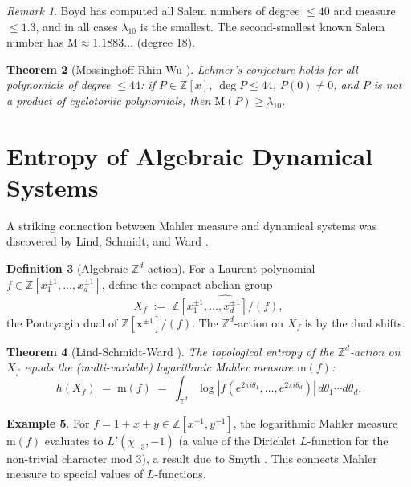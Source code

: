 \documentclass[12pt,a4paper]{amsart}
\newtheorem{theorem}{Theorem}[section]
\theoremstyle{definition}
\newtheorem{definition}[theorem]{Definition}
\newtheorem{example}[theorem]{Example}
\theoremstyle{remark}
\newtheorem{remark}[theorem]{Remark}
\newcommand{\Z}{\mathbb{Z}}
\newcommand{\T}{\mathbb{T}}
\newcommand{\M}{\mathrm{M}}
\newcommand{\m}{\mathrm{m}}
\DeclareMathOperator{\deg}{deg}
\begin{document}
\begin{remark}
  Boyd \cite{Boyd1977,Boyd1981} has computed all Salem numbers of degree $\leq 40$ and
  measure $\leq 1.3$, and in all cases $\lambda_{10}$ is the smallest. The second-smallest
  known Salem number has $\M \approx 1.1883\ldots$ (degree 18).
\end{remark}

\begin{theorem}[Mossinghoff-Rhin-Wu \cite{MRW2008}]
  Lehmer's conjecture holds for all polynomials of degree $\leq 44$: if
  $P \in \Z[x]$, $\deg P \leq 44$, $P(0) \neq 0$, and $P$ is not a product of
  cyclotomic polynomials, then $\M(P) \geq \lambda_{10}$.
\end{theorem}

\section{Entropy of Algebraic Dynamical Systems}\label{sec:entropy}

A striking connection between Mahler measure and dynamical systems was discovered by
Lind, Schmidt, and Ward \cite{LSW1990}.

\begin{definition}[Algebraic $\Z^d$-action]
  For a Laurent polynomial $f \in \Z[x_1^{\pm 1},\ldots,x_d^{\pm 1}]$, define the
  compact abelian group
  \[
    X_f \;:=\; \widehat{\Z[x_1^{\pm 1},\ldots,x_d^{\pm 1}]/(f)},
  \]
  the Pontryagin dual of $\Z[\mathbf{x}^{\pm 1}]/(f)$.
  The $\Z^d$-action on $X_f$ is by the dual shifts.
\end{definition}

\begin{theorem}[Lind-Schmidt-Ward \cite{LSW1990}]\label{thm:lsw}
  The topological entropy of the $\Z^d$-action on $X_f$ equals
  the (multi-variable) logarithmic Mahler measure $\m(f)$:
  \[
    h(X_f) \;=\; \m(f) \;=\; \int_{\T^d} \log|f(e^{2\pi i \theta_1},\ldots,e^{2\pi i \theta_d})|\,
    d\theta_1 \cdots d\theta_d.
  \]
\end{theorem}

\begin{example}
  For $f = 1 + x + y \in \Z[x^{\pm 1}, y^{\pm 1}]$, the logarithmic Mahler measure
  $\m(f)$ evaluates to $L'(\chi_{-3}, -1)$ (a value of the Dirichlet $L$-function for
  the non-trivial character mod $3$), a result due to Smyth \cite{Smyth1981}.
  This connects Mahler measure to special values of $L$-functions.
\end{example}
\end{document}
